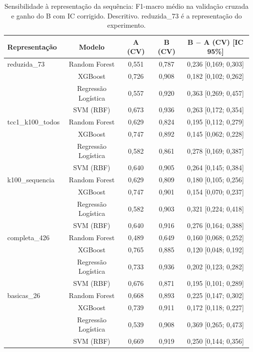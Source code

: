 \begin{table}[htbp]
  \centering
  \caption{Sensibilidade à representação da sequência: F1-macro médio na validação cruzada e ganho do B com IC corrigido. Descritivo. reduzida\_73 é a representação do experimento.}
  \label{tab:sens_representacao}
  \begin{tabular}{lcccc}
    \toprule
    Representação & Modelo & A (CV) & B (CV) & B $-$ A (CV) [IC 95\%] \\
    \midrule
    reduzida\_73 & Random Forest & 0,551 & 0,787 & 0,236 [0,169; 0,303] \\
     & XGBoost & 0,726 & 0,908 & 0,182 [0,102; 0,262] \\
     & Regressão Logística & 0,557 & 0,920 & 0,363 [0,269; 0,457] \\
     & SVM (RBF) & 0,673 & 0,936 & 0,263 [0,172; 0,354] \\
    tcc1\_k100\_todos & Random Forest & 0,629 & 0,824 & 0,195 [0,112; 0,279] \\
     & XGBoost & 0,747 & 0,892 & 0,145 [0,062; 0,228] \\
     & Regressão Logística & 0,582 & 0,861 & 0,278 [0,169; 0,387] \\
     & SVM (RBF) & 0,640 & 0,905 & 0,264 [0,145; 0,384] \\
    k100\_sequencia & Random Forest & 0,629 & 0,809 & 0,180 [0,105; 0,256] \\
     & XGBoost & 0,747 & 0,901 & 0,154 [0,070; 0,237] \\
     & Regressão Logística & 0,582 & 0,903 & 0,321 [0,224; 0,418] \\
     & SVM (RBF) & 0,640 & 0,916 & 0,276 [0,164; 0,388] \\
    completa\_426 & Random Forest & 0,489 & 0,649 & 0,160 [0,068; 0,252] \\
     & XGBoost & 0,765 & 0,885 & 0,120 [0,048; 0,192] \\
     & Regressão Logística & 0,733 & 0,936 & 0,202 [0,123; 0,282] \\
     & SVM (RBF) & 0,676 & 0,871 & 0,195 [0,101; 0,289] \\
    basicas\_26 & Random Forest & 0,668 & 0,893 & 0,225 [0,147; 0,302] \\
     & XGBoost & 0,739 & 0,911 & 0,172 [0,118; 0,227] \\
     & Regressão Logística & 0,539 & 0,908 & 0,369 [0,265; 0,473] \\
     & SVM (RBF) & 0,669 & 0,919 & 0,250 [0,144; 0,356] \\

\end{tabular}
\end{table}
